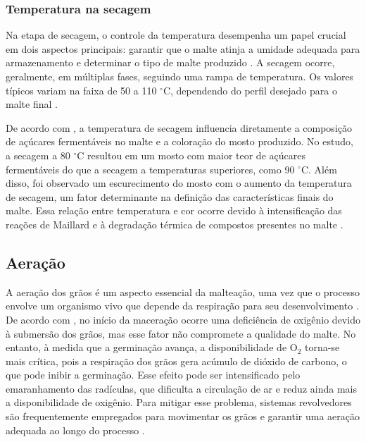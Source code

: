 \subsubsection{Temperatura na secagem}

Na etapa de secagem, o controle da temperatura desempenha um papel crucial em dois aspectos principais: garantir que o malte atinja a umidade adequada para armazenamento e determinar o tipo de malte produzido \cite{KUNZE1996}. A secagem ocorre, geralmente, em múltiplas fases, seguindo uma rampa de temperatura. Os valores típicos variam na faixa de 50 a 110 $^{\circ}$C, dependendo do perfil desejado para o malte final \cite{LEWIS2012}.

De acordo com , a temperatura de secagem influencia diretamente a composição de açúcares fermentáveis no malte e a coloração do mosto produzido. No estudo, a secagem a 80 $^{\circ}$C resultou em um mosto com maior teor de açúcares fermentáveis do que a secagem a temperaturas superiores, como 90 $^{\circ}$C. Além disso, foi observado um escurecimento do mosto com o aumento da temperatura de secagem, um fator determinante na definição das características finais do malte. Essa relação entre temperatura e cor ocorre devido à intensificação das reações de Maillard e à degradação térmica de compostos presentes no malte \cite{KUNZE1996}.

\subsection{Aeração}

A aeração dos grãos é um aspecto essencial da malteação, uma vez que o processo envolve um organismo vivo que depende da respiração para seu desenvolvimento \cite{MALLETT2022}. De acordo com , no início da maceração ocorre uma deficiência de oxigênio devido à submersão dos grãos, mas esse fator não compromete a qualidade do malte. No entanto, à medida que a germinação avança, a disponibilidade de O$_2$ torna-se mais crítica, pois a respiração dos grãos gera acúmulo de dióxido de carbono, o que pode inibir a germinação. Esse efeito pode ser intensificado pelo emaranhamento das radículas, que dificulta a circulação de ar e reduz ainda mais a disponibilidade de oxigênio. Para mitigar esse problema, sistemas revolvedores são frequentemente empregados para movimentar os grãos e garantir uma aeração adequada ao longo do processo \cite{CENCI2021}. 


